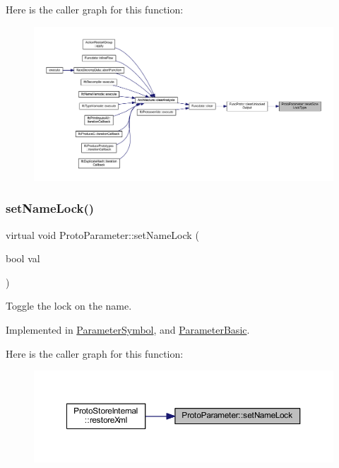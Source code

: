 Here is the caller graph for this function\+:
\nopagebreak
\begin{figure}[H]
\begin{center}
\leavevmode
\includegraphics[width=350pt]{class_proto_parameter_a15d92b3da7ab6b1cd6cf52dea6ee2978_icgraph}
\end{center}
\end{figure}
\mbox{\label{class_proto_parameter_ac444ad9eb331af2d5a72d1f1ef1250ae}} 
\subsubsection{\texorpdfstring{setNameLock()}{setNameLock()}}
{\footnotesize\ttfamily virtual void Proto\+Parameter\+::set\+Name\+Lock (\begin{DoxyParamCaption}\item[{bool}]{val }\end{DoxyParamCaption})\hspace{0.3cm}{\ttfamily [pure virtual]}}



Toggle the lock on the name. 



Implemented in \mbox{\hyperlink{class_parameter_symbol_a1a69d14c3fd3a083f36a0c47b633ea28}{Parameter\+Symbol}}, and \mbox{\hyperlink{class_parameter_basic_aad8993c75874c7ac36c92ce51f05434a}{Parameter\+Basic}}.

Here is the caller graph for this function\+:
\nopagebreak
\begin{figure}[H]
\begin{center}
\leavevmode
\includegraphics[width=350pt]{class_proto_parameter_ac444ad9eb331af2d5a72d1f1ef1250ae_icgraph}
\end{center}
\end{figure}
\mbox{\label{class_proto_parameter_a91f745d13f913e959f724e7259c52fa2}} 
